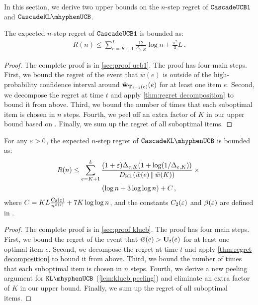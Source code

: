 In this section, we derive two upper bounds on the $n$-step regret of ${\tt CascadeUCB1}$ and $\cascadeklucb$.

\begin{theorem}
\label{thm:ucb1} The expected $n$-step regret of ${\tt CascadeUCB1}$ is bounded as:
\begin{align*}
  R(n) \leq
  \sum_{e = K + 1}^L \frac{12}{\Delta_{e, K}} \log n + \frac{\pi^2}{3} L\,.
\end{align*}
\end{theorem}
\begin{proof}
The complete proof is in \cref{sec:proof ucb1}. The proof has four main steps. First, we bound the regret of the event that $\bar{w}(e)$ is outside of the high-probability confidence interval around $\hat{\mathbf{w}}_{\mathbf{T}_{t - 1}(e)}(e)$ for at least one item $e$. Second, we decompose the regret at time $t$ and apply \cref{thm:regret decomposition} to bound it from above. Third, we bound the number of times that each suboptimal item is chosen in $n$ steps. Fourth, we peel off an extra factor of $K$ in our upper bound based on \citet{kveton14matroid}. Finally, we sum up the regret of all suboptimal items.
\end{proof}

\begin{theorem}
\label{thm:klucb} For any $\varepsilon > 0$, the expected $n$-step regret of $\cascadeklucb$ is bounded as:
\begin{align*}
  R(n)
  & \leq \sum_{e = K + 1}^L
  \frac{(1 + \varepsilon) \Delta_{e, K} (1 + \log(1 / \Delta_{e, K}))}{D_\mathrm{KL}(\bar{w}(e) \,\|\, \bar{w}(K))} \times {} \\
  & \qquad\qquad\ (\log n + 3 \log \log n) + C\,,
\end{align*}
where $C = K L \frac{C_2(\varepsilon)}{n^{\beta(\varepsilon)}} + 7 K \log \log n$, and the constants $C_2(\varepsilon)$ and $\beta(\varepsilon)$ are defined in \citet{garivier11klucb}. 
\end{theorem}
\begin{proof}
The complete proof is in \cref{sec:proof klucb}. The proof has four main steps. First, we bound the regret of the event that $\bar{w}(e) > \mathbf{U}_t(e)$ for at least one optimal item $e$. Second, we decompose the regret at time $t$ and apply \cref{thm:regret decomposition} to bound it from above. Third, we bound the number of times that each suboptimal item is chosen in $n$ steps. Fourth, we derive a new peeling argument for $\klucb$ (\cref{lem:klucb peeling}) and eliminate an extra factor of $K$ in our upper bound. Finally, we sum up the regret of all suboptimal items.
\end{proof}
